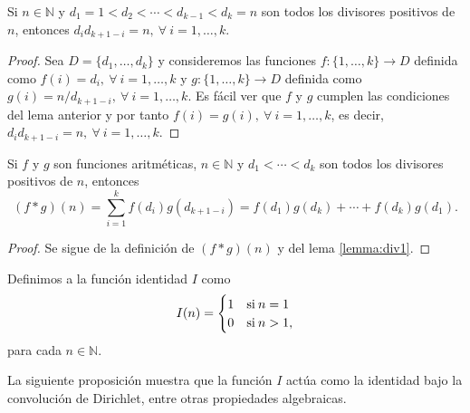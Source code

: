 \begin{lemma}\label{lemma:div1}
Si $n\in\mathbb{N}$ y $d_1=1<d_2<\cdots<d_{k-1}<d_k=n$ son todos los divisores positivos de $n$, entonces $d_i d_{k+1-i}=n,\:\forall \: i=1,\ldots,k$.
\end{lemma}
\begin{proof}
Sea $D=\{d_1,\ldots,d_k\}$ y consideremos las funciones $f: \{1,\ldots,k\} \longrightarrow D$ definida como $f(i)=d_i,\:\forall \: i=1,\ldots,k$ y $g: \{1,\ldots,k\} \longrightarrow D$ definida como $g(i)=n/d_{k+1-i},\:\forall \: i=1,\ldots,k$. Es fácil ver que $f$ y $g$ cumplen las condiciones del lema anterior y por tanto $f(i)=g(i),\:\forall \: i=1,\ldots,k$, es decir, $d_i d_{k+1-i}=n,\:\forall \: i=1,\ldots,k$.
\end{proof}

\begin{proposition}\label{prop:dir1}
Si $f$ y $g$ son funciones aritméticas, $n\in\mathbb{N}$ y $d_1<\cdots<d_k$ son todos los divisores positivos de $n$, entonces 
\begin{equation*}
	(f*g)(n)=\sum_{i=1}^{k} f(d_i)g(d_{k+1-i})=f(d_1)g(d_k)+\cdots+f(d_k)g(d_1).
\end{equation*}
\begin{proof}
Se sigue de la definición de $(f*g)(n)$ y del lema \eqref{lemma:div1}.
\end{proof}
\end{proposition}

\begin{definition}
Definimos a la función identidad $I$ como 
\begin{equation*}
	I(n) =
		\begin{cases}
			\hfil 1 & \text{si} \: n=1 \\ 
			\hfil 0 & \text{si} \: n>1,
		\end{cases}
\end{equation*}
para cada $n\in\mathbb{N}$.
\end{definition}

La siguiente proposición muestra que la función $I$ actúa como la identidad bajo la convolución de Dirichlet, entre otras propiedades algebraicas.

